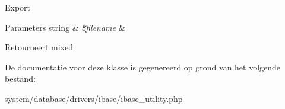 Export


\begin{DoxyParams}[1]{Parameters}
string & {\em \$filename} & \\
\hline
\end{DoxyParams}
\begin{DoxyReturn}{Retourneert}
mixed 
\end{DoxyReturn}


De documentatie voor deze klasse is gegenereerd op grond van het volgende bestand\+:\begin{DoxyCompactItemize}
\item 
system/database/drivers/ibase/ibase\+\_\+utility.\+php\end{DoxyCompactItemize}
